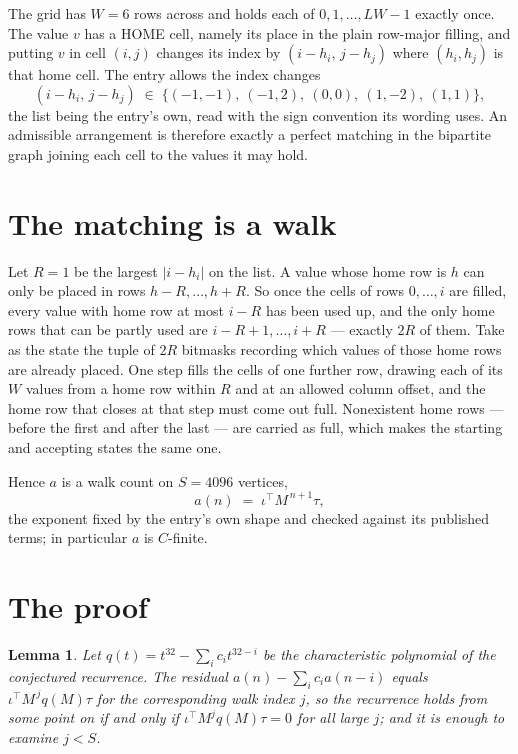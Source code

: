 \documentclass[11pt,a4paper]{article}
\theoremstyle{plain}
\newtheorem{lemma}[theorem]{Lemma}
\theoremstyle{definition}
\begin{document}
The grid has $W=6$ rows across and holds each of $0,1,\dots,LW-1$ exactly once. The value
$v$ has a HOME cell, namely its place in the plain row-major filling, and putting $v$ in cell
$(i,j)$ changes its index by $(i-h_i,\,j-h_j)$ where $(h_i,h_j)$ is that home cell. The entry
allows the index changes
\[
(i-h_i,\,j-h_j)\;\in\;\{(-1,-1),\ (-1,2),\ (0,0),\ (1,-2),\ (1,1)\},
\]
the list being the entry's own, read with the sign convention its wording uses. An admissible
arrangement is therefore exactly a perfect matching in the bipartite graph joining each cell to
the values it may hold.

\section{The matching is a walk}

Let $R=1$ be the largest $|i-h_i|$ on the list. A value whose home row is $h$ can only be
placed in rows $h-R,\dots,h+R$. So once the cells of rows $0,\dots,i$ are filled, every
value with home row at most $i-R$ has been used up, and the only home rows that can be
partly used are $i-R+1,\dots,i+R$ --- exactly $2R$ of them. Take as the state the tuple of
$2R$ bitmasks recording which values of those home rows are already placed. One step fills
the cells of one further row, drawing each of its $W$ values from a home row within $R$
and at an allowed column offset, and the home row that closes at that step must come out
full. Nonexistent home rows --- before the first and after the last --- are carried as
full, which makes the starting and accepting states the same one.

Hence $a$ is a walk count on $S=4096$ vertices,
\[
a(n)\;=\;\iota^{\!\top}M^{\,n+1}\tau ,
\]
the exponent fixed by the entry's own shape and checked against its published terms; in
particular $a$ is $C$-finite.

\section{The proof}

\begin{lemma}\label{lem:crit}
Let $q(t)=t^{32}-\sum_i c_it^{32-i}$ be the characteristic polynomial of the
conjectured recurrence. The residual $a(n)-\sum_ic_ia(n-i)$ equals
$\iota^{\!\top}M^{\,j}q(M)\tau$ for the corresponding walk index $j$, so the recurrence
holds from some point on if and only if $\iota^{\!\top}M^{j}q(M)\tau=0$ for all large $j$;
and it is enough to examine $j<S$.
\end{lemma}
\end{document}
